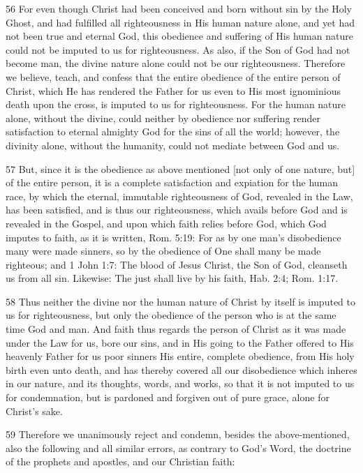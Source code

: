 56 For even though Christ had been conceived and born without sin by the Holy Ghost, and had fulfilled all righteousness in His human nature alone, and yet had not been true and eternal God, this obedience and suffering of His human nature could not be imputed to us for righteousness. As also, if the Son of God had not become man, the divine nature alone could not be our righteousness. Therefore we believe, teach, and confess that the entire obedience of the entire person of Christ, which He has rendered the Father for us even to His most ignominious death upon the cross, is imputed to us for righteousness. For the human nature alone, without the divine, could neither by obedience nor suffering render satisfaction to eternal almighty God for the sins of all the world; however, the divinity alone, without the humanity, could not mediate between God and us.

57 But, since it is the obedience as above mentioned [not only of one nature, but] of the entire person, it is a complete satisfaction and expiation for the human race, by which the eternal, immutable righteousness of God, revealed in the Law, has been satisfied, and is thus our righteousness, which avails before God and is revealed in the Gospel, and upon which faith relies before God, which God imputes to faith, as it is written, Rom. 5:19: For as by one man’s disobedience many were made sinners, so by the obedience of One shall many be made righteous; and 1 John 1:7: The blood of Jesus Christ, the Son of God, cleanseth us from all sin. Likewise: The just shall live by his faith, Hab. 2:4; Rom. 1:17.

58 Thus neither the divine nor the human nature of Christ by itself is imputed to us for righteousness, but only the obedience of the person who is at the same time God and man. And faith thus regards the person of Christ as it was made under the Law for us, bore our sins, and in His going to the Father offered to His heavenly Father for us poor sinners His entire, complete obedience, from His holy birth even unto death, and has thereby covered all our disobedience which inheres in our nature, and its thoughts, words, and works, so that it is not imputed to us for condemnation, but is pardoned and forgiven out of pure grace, alone for Christ’s sake.

59 Therefore we unanimously reject and condemn, besides the above-mentioned, also the following and all similar errors, as contrary to God’s Word, the doctrine of the prophets and apostles, and our Christian faith:

